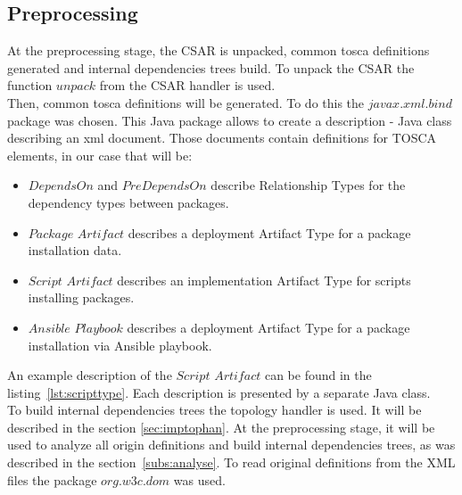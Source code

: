 \subsection*{Preprocessing}
At the preprocessing stage, the CSAR is unpacked, common \gls{tosca} definitions generated and internal dependencies trees build. 
%
To unpack the CSAR the function $unpack$ from the CSAR handler is used.\\
%
Then, common \gls{tosca} definitions will be generated.
To do this the $javax$.$xml$.$bind$ package was chosen. 
This Java package allows to create a description - Java class describing an xml document. 
Those documents contain definitions for TOSCA elements, in our case that will be:
\begin{itemize}
	\item $DependsOn$ and $PreDependsOn$ describe Relationship Types %
	 for the dependency types between packages.%
	\item $Package$ $Artifact$ describes a deployment Artifact Type for a package installation data.
	\item $Script$ $Artifact$ describes an implementation Artifact Type for scripts installing packages.
	\item $Ansible$ $Playbook$ describes a deployment Artifact Type for a package installation via Ansible playbook.
\end{itemize}
An example description of the $Script$ $Artifact$ can be found in the listing~\ref{lst:scripttype}.
Each description is presented by a separate Java class.\\
%
To build internal dependencies trees the topology handler is used. 
It will be described in the section \ref{sec:imptophan}.
At the preprocessing stage, it will be used to analyze all origin definitions and build internal dependencies trees, as was described in the section~\ref{subs:analyse}.
To read original definitions from the XML files the package $org$.$w3c$.$dom$ was used.\\

